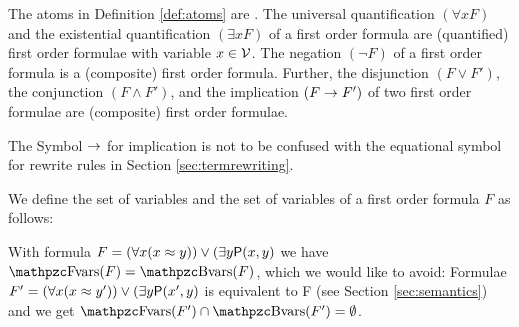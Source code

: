 
\begin{definition}\label{def:syntax:FOF}
	The atoms in Definition \vref{def:atoms} are .
	The universal quantification $(\forall x F)$
	and the existential quantification $(\exists x F)$
	of a first order formula are (quantified) first order formulae
	with  variable $x\in\mathcal{V}$.
	The negation $(\lnot F)$ of a first order formula
	is a (composite) first order formula.
	Further, the disjunction $(F \lor F')$,
	the conjunction $(F \land F') $,
	and the implication $(F \rightarrow F')$
	of two first order formulae
	are (composite) first order formulae.
\end{definition}

\begin{remark}
	The Symbol $\rightarrow$ for implication is not to be confused
	with the equational symbol for rewrite rules in Section \ref{sec:termrewriting}.
\end{remark}

\begin{definition}\label{def:fof:fvars}\label{def:fof:bvars}
	We define the set of  variables and the set of  variables
	of a first order formula $F$ as follows:
\end{definition}

\begin{example}
	With formula $F = (\forall x (x\approx y)) \lor (\exists y \mathsf{P}(x,y)$
	we have $\fvar(F) = \bvar(F)$, which we would like to avoid:
	Formulae
	$F' = (\forall x (x\approx y')) \lor (\exists y \mathsf{P}(x',y)$
	is equivalent to F (see Section \vref{sec:semantics})
	and we get
	$\fvar(F') \cap \bvar(F') = \emptyset$.
\end{example}

